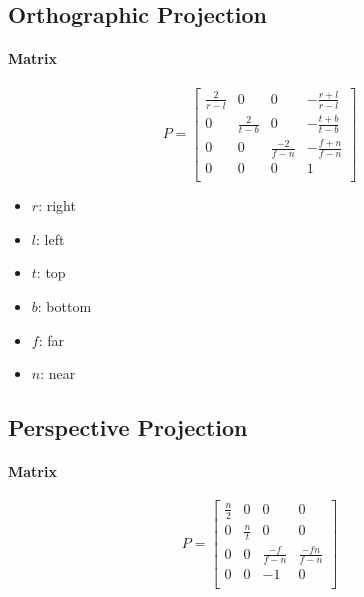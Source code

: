   \subsection{Orthographic Projection}

    \paragraph{Matrix}
    \begin{equation}
      P =
      \begin{bmatrix}
        \frac{2}{r - l} & 0 & 0 & -\frac{r + l}{r - l} \\
        0 & \frac{2}{t - b} & 0 & -\frac{t + b}{t - b} \\
        0 & 0 & \frac{-2}{f - n} & -\frac{f + n}{f - n} \\
        0 & 0 & 0 & 1 \\
      \end{bmatrix}
    \end{equation}

    \begin{itemize}
      \item $ r $: right
      \item $ l $: left
      \item $ t $: top
      \item $ b $: bottom
      \item $ f $: far
      \item $ n $: near
    \end{itemize}

  \subsection{Perspective Projection}

    \paragraph{Matrix}
    \begin{equation}
      P =
      \begin{bmatrix}
        \frac{n}{2} & 0 & 0 & 0 \\
        0 & \frac{n}{t} & 0 & 0 \\
        0 & 0 & \frac{-f}{f - n} & \frac{-fn}{f - n} \\
        0 & 0 & -1 & 0 \\
      \end{bmatrix}
    \end{equation}

